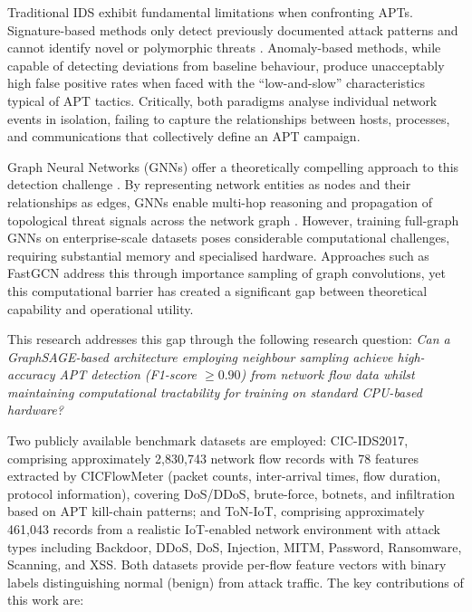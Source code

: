 \documentclass[conference]{IEEEtran}
\begin{document}
Traditional IDS exhibit fundamental limitations when confronting APTs.
Signature-based methods only detect previously documented attack patterns and
cannot identify novel or polymorphic threats \cite{bilot2024}. Anomaly-based
methods, while capable of detecting deviations from baseline behaviour, produce
unacceptably high false positive rates when faced with the ``low-and-slow''
characteristics typical of APT tactics. Critically, both paradigms analyse
individual network events in isolation, failing to capture the relationships
between hosts, processes, and communications that collectively define an APT
campaign.

Graph Neural Networks (GNNs) offer a theoretically compelling approach to this
detection challenge \cite{gilmer2017,xu2019gin}. By representing network
entities as nodes and their relationships as edges, GNNs enable multi-hop
reasoning and propagation of topological threat signals across the network graph
\cite{xu2024,zhou2020}. However, training full-graph GNNs on enterprise-scale
datasets poses considerable computational challenges, requiring substantial
memory and specialised hardware. Approaches such as FastGCN \cite{chen2018fastgcn} address this through
importance sampling of graph convolutions, yet this computational barrier has
created a significant gap between theoretical capability and operational utility.

This research addresses this gap through the following research question:
\textit{Can a GraphSAGE-based architecture employing neighbour sampling achieve
high-accuracy APT detection (F1-score $\geq 0.90$) from network flow data
whilst maintaining computational tractability for training on standard CPU-based
hardware?}

Two publicly available benchmark datasets are employed: CIC-IDS2017, comprising
approximately 2,830,743 network flow records with 78 features extracted by
CICFlowMeter (packet counts, inter-arrival times, flow duration, protocol
information), covering DoS/DDoS, brute-force, botnets, and infiltration based
on APT kill-chain patterns; and ToN-IoT, comprising approximately 461,043
records from a realistic IoT-enabled network environment with attack types
including Backdoor, DDoS, DoS, Injection, MITM, Password, Ransomware, Scanning,
and XSS. Both datasets provide per-flow feature vectors with binary labels
distinguishing normal (benign) from attack traffic. The key contributions of
this work are:
\end{document}
